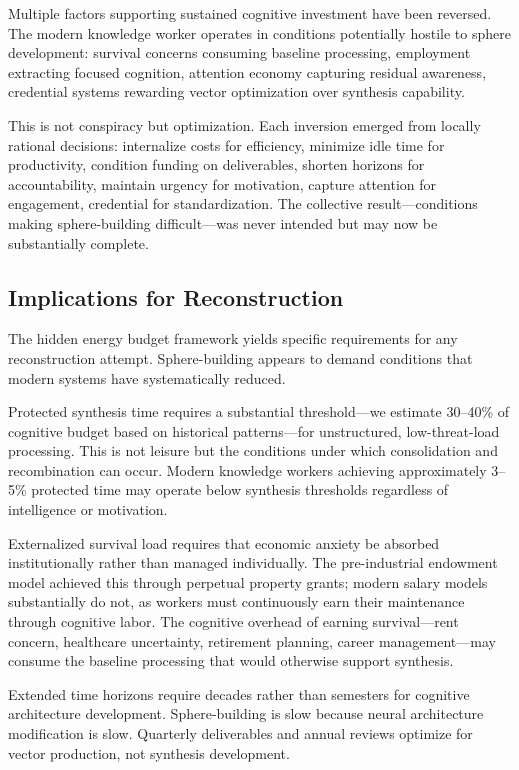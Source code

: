 Multiple factors supporting sustained cognitive investment have been reversed. The modern knowledge worker operates in conditions potentially hostile to sphere development: survival concerns consuming baseline processing, employment extracting focused cognition, attention economy capturing residual awareness, credential systems rewarding vector optimization over synthesis capability.

This is not conspiracy but optimization. Each inversion emerged from locally rational decisions: internalize costs for efficiency, minimize idle time for productivity, condition funding on deliverables, shorten horizons for accountability, maintain urgency for motivation, capture attention for engagement, credential for standardization. The collective result---conditions making sphere-building difficult---was never intended but may now be substantially complete.

\subsection{Implications for Reconstruction}

The hidden energy budget framework yields specific requirements for any reconstruction attempt. Sphere-building appears to demand conditions that modern systems have systematically reduced.

Protected synthesis time requires a substantial threshold---we estimate 30--40\% of cognitive budget based on historical patterns---for unstructured, low-threat-load processing. This is not leisure but the conditions under which consolidation and recombination can occur. Modern knowledge workers achieving approximately 3--5\% protected time may operate below synthesis thresholds regardless of intelligence or motivation.

Externalized survival load requires that economic anxiety be absorbed institutionally rather than managed individually. The pre-industrial endowment model achieved this through perpetual property grants; modern salary models substantially do not, as workers must continuously earn their maintenance through cognitive labor. The cognitive overhead of earning survival---rent concern, healthcare uncertainty, retirement planning, career management---may consume the baseline processing that would otherwise support synthesis.

Extended time horizons require decades rather than semesters for cognitive architecture development. Sphere-building is slow because neural architecture modification is slow. Quarterly deliverables and annual reviews optimize for vector production, not synthesis development.

